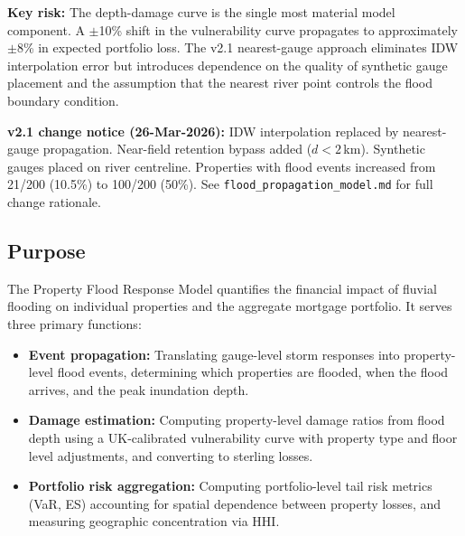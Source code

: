 \documentclass[11pt,a4paper]{article}
\begin{document}
\textbf{Key risk:} The depth-damage curve is the single most material model component. A
$\pm$10\% shift in the vulnerability curve propagates to approximately $\pm$8\% in
expected portfolio loss. The v2.1 nearest-gauge approach eliminates IDW interpolation
error but introduces dependence on the quality of synthetic gauge placement and the
assumption that the nearest river point controls the flood boundary condition.

\textbf{v2.1 change notice (26-Mar-2026):} IDW interpolation replaced by nearest-gauge
propagation. Near-field retention bypass added ($d < 2$\,km). Synthetic gauges placed on
river centreline. Properties with flood events increased from 21/200 (10.5\%) to 100/200
(50\%). See \texttt{flood\_propagation\_model.md} for full change rationale.

\mkmpurpose

\subsection{Purpose}
The Property Flood Response Model quantifies the financial impact of fluvial flooding
on individual properties and the aggregate mortgage portfolio. It serves three primary
functions:

\begin{itemize}[nosep]
    \item \textbf{Event propagation:} Translating gauge-level storm responses into
          property-level flood events, determining which properties are flooded, when
          the flood arrives, and the peak inundation depth.
    \item \textbf{Damage estimation:} Computing property-level damage ratios from flood
          depth using a UK-calibrated vulnerability curve with property type and floor
          level adjustments, and converting to sterling losses.
    \item \textbf{Portfolio risk aggregation:} Computing portfolio-level tail risk
          metrics (VaR, ES) accounting for spatial dependence between property losses,
          and measuring geographic concentration via HHI.
\end{itemize}
\end{document}
